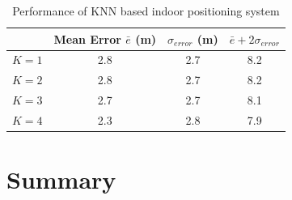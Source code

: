 \begin{table}[h]
    \centering
    \caption{Performance of KNN based indoor positioning system \label{tab:knnperf}}
    \begin{tabular}{|l|c|c|c|}
    \hline
              & Mean Error $\bar{e}$ (m) & $\sigma_{error}$ (m) & $\bar{e} + 2 \sigma_{error}$ \\
    \hline
    \hline
    $K = 1$    & 2.8 & 2.7 & 8.2 \\
    $K = 2$    & 2.8 & 2.7 & 8.2 \\
    $K = 3$    & 2.7 & 2.7 & 8.1 \\
    $K = 4$    & 2.3 & 2.8 & 7.9 \\
    \hline
    \end{tabular}

\end{table}


\section{Summary}
